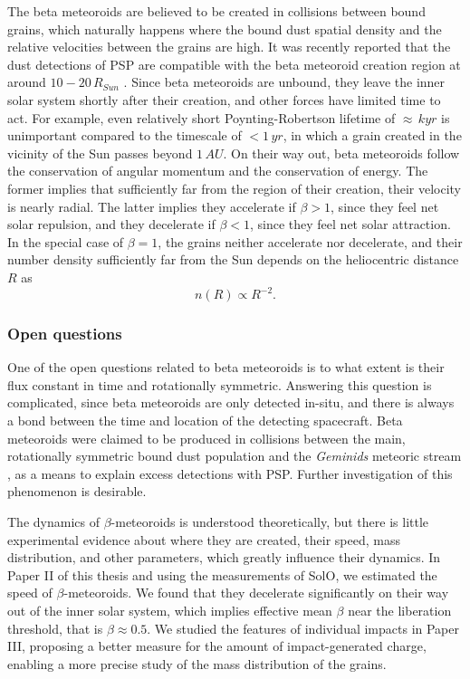 The beta meteoroids are believed to be created in collisions between bound grains, which naturally happens where the bound dust spatial density and the relative velocities between the grains are high. It was recently reported that the dust detections of PSP are compatible with the beta meteoroid creation region at around $10 - 20 \, R_{Sun}$ \citep{szalay2021collisional}. Since beta meteoroids are unbound, they leave the inner solar system shortly after their creation, and other forces have limited time to act. For example, even relatively short Poynting-Robertson lifetime of $\approx \, kyr$ is unimportant compared to the timescale of $< 1 \, \si{yr}$, in which a grain created in the vicinity of the Sun passes beyond $1 \, \si{AU}$. On their way out, beta meteoroids follow the conservation of angular momentum and the conservation of energy. The former implies that sufficiently far from the region of their creation, their velocity is nearly radial. The latter implies they accelerate if $\beta > 1$, since they feel net solar repulsion, and they decelerate if $\beta < 1$, since they feel net solar attraction. In the special case of $\beta=1$, the grains neither accelerate nor decelerate, and their number density sufficiently far from the Sun depends on the heliocentric distance $R$ as
\begin{equation}
    n(R) \propto R^{-2}. \label{eq:beta_number_density}
\end{equation} 

\subsubsection{Open questions}

One of the open questions related to beta meteoroids is to what extent is their flux constant in time and rotationally symmetric. Answering this question is complicated, since beta meteoroids are only detected in-situ, and there is always a bond between the time and location of the detecting spacecraft. Beta meteoroids were claimed to be produced in collisions between the main, rotationally symmetric bound dust population and the \textit{Geminids} meteoric stream \citep{szalay2021collisional}, as a means to explain excess detections with PSP. Further investigation of this phenomenon is desirable.

The dynamics of $\beta$-meteoroids is understood theoretically, but there is little experimental evidence about where they are created, their speed, mass distribution, and other parameters, which greatly influence their dynamics. In Paper II of this thesis and using the measurements of SolO, we estimated the speed of $\beta$-meteoroids. We found that they decelerate significantly on their way out of the inner solar system, which implies effective mean $\beta$ near the liberation threshold, that is $\beta \approx 0.5$. We studied the features of individual impacts in Paper III, proposing a better measure for the amount of impact-generated charge, enabling a more precise study of the mass distribution of the grains. 

